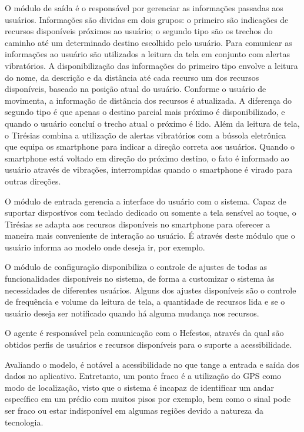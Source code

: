 \documentclass[english,brazilian]{UNISINOSmonografia}
\begin{document}
O módulo de saída é o responsável por gerenciar as informações passadas aos usuários. Informações são dividas em dois grupos: o primeiro são indicações de recursos disponíveis próximos ao usuário; o segundo tipo são os trechos do caminho até um determinado destino escolhido pelo usuário. Para comunicar as informações ao usuário são utilizados a leitura da tela em conjunto com alertas vibratórios. A disponibilização das informações do primeiro tipo envolve a leitura do nome, da descrição e da distância até cada recurso um dos recursos disponíveis, baseado na posição atual do usuário. Conforme o usuário de movimenta, a informação de distância dos recursos é atualizada. A diferença do segundo tipo é que apenas o destino parcial mais próximo é disponibilizado, e quando o usuário concluí o trecho atual o próximo é lido. Além da leitura de tela, o Tirésias combina a utilização de alertas vibratórios com a bússola eletrônica que equipa os smartphone para indicar a direção correta aos usuários. Quando o smartphone está voltado em direção do próximo destino, o fato é informado ao usuário através de vibrações, interrompidas quando o smartphone é virado para outras direções.

O módulo de entrada gerencia a interface do usuário com o sistema. Capaz de suportar dispostívos com teclado dedicado ou somente a tela sensível ao toque, o Tirésias se adapta aos recursos disponíveis no smartphone para oferecer a maneira mais conveniente de interação ao usuário. É através deste módulo que o usuário informa ao modelo onde deseja ir, por exemplo.

O módulo de configuração disponibiliza o controle de ajustes de todas as funcionalidades disponíveis no sistema, de forma a customizar o sistema às necessidades de diferentes usuários. Alguns dos ajustes disponíveis são o controle de frequência e volume da leitura de tela, a quantidade de recursos lida e se o usuário deseja ser notificado quando há alguma mudança nos recursos.

O agente é responsável pela comunicação com o Hefestos, através da qual são obtidos perfis de usuários e recursos disponíveis para o suporte a acessibilidade. 

Avaliando o modelo, é notável a acessibilidade no que tange a entrada e saída dos dados no aplicativo. Entretanto, um ponto fraco é a utilização do GPS como modo de localização, visto que o sistema é incapaz de identificar um andar específico em um prédio com muitos pisos por exemplo, bem como o sinal pode ser fraco ou estar indisponível em algumas regiões devido a natureza da tecnologia. 
\end{document}
